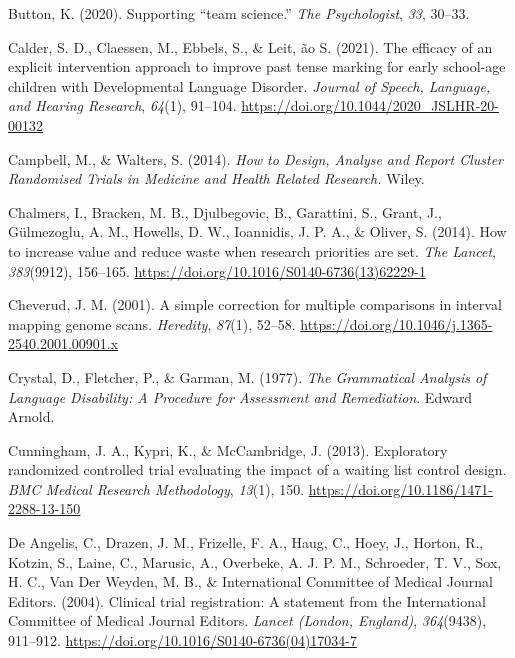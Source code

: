 \documentclass{krantz}
\newlength{\cslhangindent}
\newlength{\cslentryspacingunit} %
\newenvironment{CSLReferences}[2] %
{%
\setlength{\parindent}{0pt}
\ifodd #1
\let\oldpar\par
\def\par{\hangindent=\cslhangindent\oldpar}
\fi
\setlength{\parskip}{#2\cslentryspacingunit}
}%
{}
\begin{document}
\begin{CSLReferences}{1}{0}
\leavevmode{}%
Button, K. (2020). Supporting {``team science.''} \emph{The Psychologist}, \emph{33}, 30--33.

\leavevmode{}%
Calder, S. D., Claessen, M., Ebbels, S., \& Leit, ão S. (2021). The efficacy of an explicit intervention approach to improve past tense marking for early school-age children with {Developmental Language Disorder}. \emph{Journal of Speech, Language, and Hearing Research}, \emph{64}(1), 91--104. \url{https://doi.org/10.1044/2020_JSLHR-20-00132}

\leavevmode{}%
Campbell, M., \& Walters, S. (2014). \emph{How to {Design}, {Analyse} and {Report Cluster Randomised Trials} in {Medicine} and {Health Related Research}.} {Wiley}.

\leavevmode{}%
Chalmers, I., Bracken, M. B., Djulbegovic, B., Garattini, S., Grant, J., Gülmezoglu, A. M., Howells, D. W., Ioannidis, J. P. A., \& Oliver, S. (2014). How to increase value and reduce waste when research priorities are set. \emph{The Lancet}, \emph{383}(9912), 156--165. \url{https://doi.org/10.1016/S0140-6736(13)62229-1}

\leavevmode{}%
Cheverud, J. M. (2001). A simple correction for multiple comparisons in interval mapping genome scans. \emph{Heredity}, \emph{87}(1), 52--58. \url{https://doi.org/10.1046/j.1365-2540.2001.00901.x}

\leavevmode{}%
Crystal, D., Fletcher, P., \& Garman, M. (1977). \emph{The {Grammatical Analysis} of {Language Disability}: {A Procedure} for {Assessment} and {Remediation}}. {Edward Arnold}.

\leavevmode{}%
Cunningham, J. A., Kypri, K., \& McCambridge, J. (2013). Exploratory randomized controlled trial evaluating the impact of a waiting list control design. \emph{BMC Medical Research Methodology}, \emph{13}(1), 150. \url{https://doi.org/10.1186/1471-2288-13-150}

\leavevmode{}%
De Angelis, C., Drazen, J. M., Frizelle, F. A., Haug, C., Hoey, J., Horton, R., Kotzin, S., Laine, C., Marusic, A., Overbeke, A. J. P. M., Schroeder, T. V., Sox, H. C., Van Der Weyden, M. B., \& International Committee of Medical Journal Editors. (2004). Clinical trial registration: A statement from the {International Committee} of {Medical Journal Editors}. \emph{Lancet (London, England)}, \emph{364}(9438), 911--912. \url{https://doi.org/10.1016/S0140-6736(04)17034-7}


\end{CSLReferences}
\end{document}

